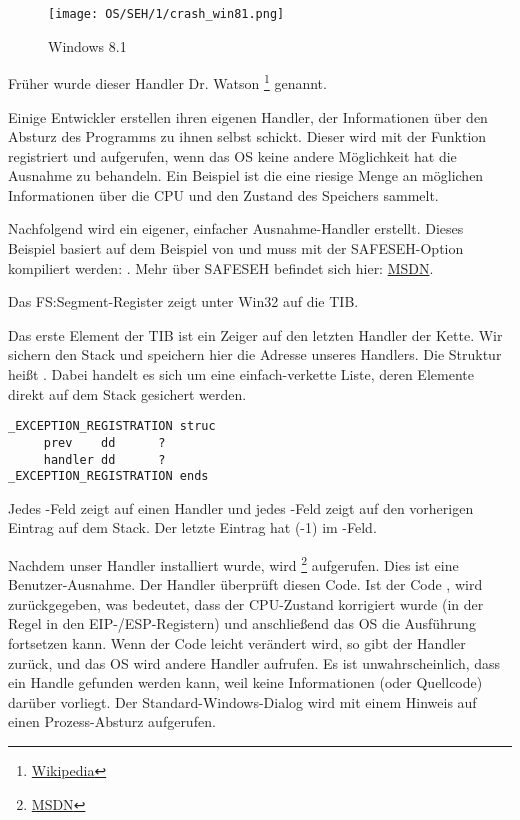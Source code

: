 \begin{figure}[H]
\centering
\texttt{[image: OS/SEH/1/crash\_win81.png]}
\caption{Windows 8.1}
\end{figure}

Früher wurde dieser Handler Dr. Watson
\footnote{\href{http://go.yurichev.com/17046}{Wikipedia}}
genannt.

Einige Entwickler erstellen ihren eigenen Handler, der Informationen über den Absturz
des Programms zu ihnen selbst schickt.
Dieser wird mit der Funktion  registriert und aufgerufen,
wenn das \ac{OS} keine andere Möglichkeit hat die Ausnahme zu behandeln.
\myindex{\oracle}
Ein Beispiel ist \oracle die eine riesige Menge an möglichen Informationen über die \ac{CPU}
und den Zustand des Speichers sammelt.

Nachfolgend wird ein eigener, einfacher Ausnahme-Handler erstellt.
Dieses Beispiel basiert auf dem Beispiel von \PietrekSEH und muss mit der SAFESEH-Option
kompiliert werden: .
Mehr über SAFESEH befindet sich hier: \href{http://go.yurichev.com/17252}{MSDN}.



Das FS:Segment-Register zeigt unter Win32 auf die \ac{TIB}.

Das erste Element der \ac{TIB} ist ein Zeiger auf den letzten Handler der Kette.
Wir sichern den Stack und speichern hier die Adresse unseres Handlers.
Die Struktur heißt . Dabei handelt es sich um eine
einfach-verkette Liste, deren Elemente direkt auf dem Stack gesichert werden.

\begin{lstlisting}[caption=MSVC/VC/crt/src/exsup.inc,style=customasmx86]
_EXCEPTION_REGISTRATION struc
     prev    dd      ?
     handler dd      ?
_EXCEPTION_REGISTRATION ends
\end{lstlisting}

Jedes -Feld zeigt auf einen Handler und jedes -Feld zeigt auf den
vorherigen Eintrag auf dem Stack.
Der letzte Eintrag hat  (-1) im -Feld.



Nachdem unser Handler installiert wurde, wird 
\footnote{\href{http://go.yurichev.com/17253}{MSDN}} aufgerufen.
Dies ist eine Benutzer-Ausnahme.
Der Handler überprüft diesen Code.
Ist der Code , wird  zurückgegeben,
was bedeutet, dass der CPU-Zustand korrigiert wurde (in der Regel in den EIP-/ESP-Registern)
und anschließend das \ac{OS} die Ausführung fortsetzen kann.
Wenn der Code leicht verändert wird, so gibt der Handler  zurück,
und das \ac{OS} wird andere Handler aufrufen.
Es ist unwahrscheinlich, dass ein Handle gefunden werden kann, weil keine Informationen
(oder Quellcode) darüber vorliegt.
Der Standard-Windows-Dialog wird mit einem Hinweis auf einen Prozess-Absturz aufgerufen.

